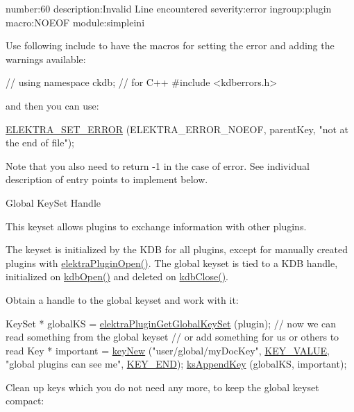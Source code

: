 \begin{DoxyCodeInclude}
number:60
description:Invalid Line encountered
severity:error
ingroup:plugin
macro:NOEOF
module:simpleini
\end{DoxyCodeInclude}
 Use following include to have the macros for setting the error and adding the warnings available\+:


\begin{DoxyCodeInclude}
\textcolor{comment}{// using namespace ckdb; // for C++}
\textcolor{preprocessor}{#include <kdberrors.h>}
\end{DoxyCodeInclude}
 and then you can use\+:


\begin{DoxyCodeInclude}
\hyperlink{group__plugin_gaab1842b82272e6d4235b6a71587a64d9}{ELEKTRA\_SET\_ERROR} (ELEKTRA\_ERROR\_NOEOF, parentKey, \textcolor{stringliteral}{"not at the end of file"});
\end{DoxyCodeInclude}
 Note that you also need to return -\/1 in the case of error. See individual description of entry points to implement below.

\begin{DoxyParagraph}{Global Key\+Set Handle}

\end{DoxyParagraph}
This keyset allows plugins to exchange information with other plugins.

The keyset is initialized by the K\+DB for all plugins, except for manually created plugins with {\ttfamily \hyperlink{elektra_2plugin_8c_a32a70a7876542c51d153164ac5108a57}{elektra\+Plugin\+Open()}}. The global keyset is tied to a K\+DB handle, initialized on {\ttfamily \hyperlink{group__kdb_ga6808defe5870f328dd17910aacbdc6ca}{kdb\+Open()}} and deleted on {\ttfamily \hyperlink{group__kdb_gadb54dc9fda17ee07deb9444df745c96f}{kdb\+Close()}}.

Obtain a handle to the global keyset and work with it\+:


\begin{DoxyCodeInclude}
        KeySet * globalKS = \hyperlink{group__plugin_ga436cda13ed70c0face08661a90620bf6}{elektraPluginGetGlobalKeySet} (plugin);
        \textcolor{comment}{// now we can read something from the global keyset}
        \textcolor{comment}{// or add something for us or others to read}
        Key * important = \hyperlink{group__key_gad23c65b44bf48d773759e1f9a4d43b89}{keyNew} (\textcolor{stringliteral}{"user/global/myDocKey"}, \hyperlink{group__key_gga91fb3178848bd682000958089abbaf40ac66e4a49d09212b79f5754ca6db5bd2e}{KEY\_VALUE}, \textcolor{stringliteral}{"global plugins can see
       me"}, \hyperlink{group__key_gga91fb3178848bd682000958089abbaf40aa8adb6fcb92dec58fb19410eacfdd403}{KEY\_END});
        \hyperlink{group__keyset_gaa5a1d467a4d71041edce68ea7748ce45}{ksAppendKey} (globalKS, important);
\end{DoxyCodeInclude}
 Clean up keys which you do not need any more, to keep the global keyset compact\+:


